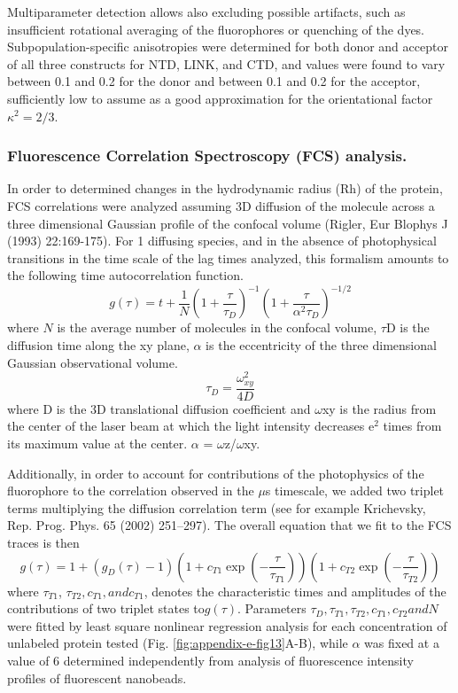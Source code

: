\documentclass[../main.tex]{subfiles}
\begin{document}
        Multiparameter detection allows also excluding possible artifacts, such as insufficient rotational averaging of the fluorophores or quenching of the dyes. Subpopulation-specific anisotropies were determined for both donor and acceptor of all three constructs for NTD, LINK, and CTD, and values were found to vary between 0.1 and 0.2 for the donor and between 0.1 and 0.2 for the acceptor, sufficiently low to assume as a good approximation for the orientational factor $\kappa^2 = 2/3$. 

    \subsubsection{Fluorescence Correlation Spectroscopy (FCS) analysis.}
        In order to determined changes in the hydrodynamic radius (Rh) of the protein, FCS correlations were analyzed assuming 3D diffusion of the molecule across a three dimensional Gaussian profile of the confocal volume (Rigler, Eur Blophys J (1993) 22:169-175). For 1 diffusing species, and in the absence of photophysical transitions in the time scale of the lag times analyzed, this formalism amounts to the following time autocorrelation function.
        \begin{equation}\label{appendix-e-eq7}
            g(\tau)=t+\frac{1}{N}(1+\frac{\tau}{\tau_D})^{-1}(1+\frac{\tau}{\alpha^2\tau_D})^{-1/2}
        \end{equation}
        where $N$ is the average number of molecules in the confocal volume, $\tau$D is the diffusion time along the xy plane, $\alpha$ is the eccentricity of the three dimensional Gaussian observational volume. 
        \begin{equation}\label{appendix-e-eq8}
            \tau_D=\frac{\omega_{xy}^2}{4D}
        \end{equation}
        where D is the 3D translational diffusion coefficient and $\omega$xy is the radius from the center of the laser beam at which the light intensity decreases e$^2$ times from its maximum value at the center. $\alpha$ = $\omega$z/$\omega$xy.

        Additionally, in order to account for contributions of the photophysics of the fluorophore to the correlation observed in the $\mu$s timescale, we added two triplet terms multiplying the diffusion correlation term (see for example Krichevsky, Rep. Prog. Phys. 65 (2002) 251–297). The overall equation that we fit to the FCS traces is then
        \begin{equation}\label{appendix-e-eq9}
            g(\tau)=1+(g_D(\tau)-1)(1+c_{T1}\exp(-\frac{\tau}{\tau_{T1}}))(1+c_{T2}\exp(-\frac{\tau}{\tau_{T2}}))
        \end{equation}
        where $\tau_{T1}$, $\tau_{T2}, c_{T1}, and c_{T1}$, denotes the characteristic times and amplitudes of the contributions of two triplet states to$ g(\tau)$. Parameters $\tau_D, \tau_{T1}, \tau_{T2}, c_{T1}, c_{T2} and N$ were fitted by least square nonlinear regression analysis for each concentration of unlabeled protein tested (Fig. \ref{fig:appendix-e-fig13}A-B), while $\alpha$ was fixed at a value of 6 determined independently from analysis of fluorescence intensity profiles of fluorescent nanobeads.
\end{document}

